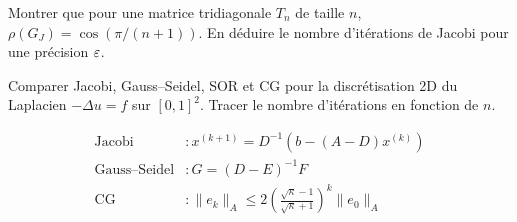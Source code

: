 \begin{exercice}[$\star\star$]
Montrer que pour une matrice tridiagonale $T_n$ de taille $n$, $\rho(G_J)=\cos(\pi/(n+1))$. En d\'eduire le nombre d'it\'erations de Jacobi pour une pr\'ecision $\varepsilon$.
\end{exercice}

\begin{exercice}
Comparer Jacobi, Gauss--Seidel, SOR et CG pour la discr\'etisation 2D du Laplacien $-\Delta u=f$ sur $[0,1]^2$. Tracer le nombre d'it\'erations en fonction de $n$.
\end{exercice}

\begin{formules}
\begin{align*}
\text{Jacobi} &: x^{(k+1)}=D^{-1}(b-(A-D)x^{(k)}) \\
\text{Gauss--Seidel} &: G=(D-E)^{-1}F \\
\text{CG} &: \|e_k\|_A\leq 2\left(\frac{\sqrt{\kappa}-1}{\sqrt{\kappa}+1}\right)^k\|e_0\|_A
\end{align*}
\end{formules}
